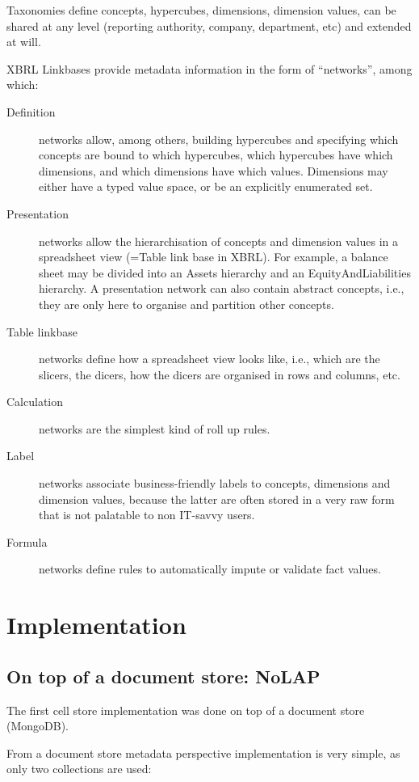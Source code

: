 \documentclass{vldb}
\begin{document}
Taxonomies define concepts, hypercubes, dimensions, dimension values, can be shared at any level (reporting authority, company, department, etc) and extended at will.

XBRL Linkbases provide metadata information in the form of ``networks'', among which:

\begin{description}
\item[Definition] networks allow, among others, building hypercubes and specifying which concepts are bound to which hypercubes, which hypercubes have which dimensions, and which dimensions have which values. Dimensions may either have a typed value space, or be an explicitly enumerated set. 
\item[Presentation] networks allow the hierarchisation of concepts and dimension values in a spreadsheet view (=Table link base in XBRL). For example, a balance sheet may be divided into an Assets hierarchy and an EquityAndLiabilities hierarchy. A presentation network can also contain abstract concepts, i.e., they are only here to organise and partition other concepts. 
\item[Table linkbase] networks define how a spreadsheet view looks like, i.e., which are the slicers, the dicers, how the dicers are organised in rows and columns, etc.
\item[Calculation] networks are the simplest kind of roll up rules.
\item[Label] networks associate business-friendly labels to concepts, dimensions and dimension values, because the latter are often stored in a very raw form that is not palatable to non IT-savvy users.
\item[Formula] networks define rules to automatically impute or validate fact values.
\end{description}

\section{Implementation}

\subsection{On top of a document store: NoLAP}

The first cell store implementation was done on top of a document store (MongoDB).

From a document store metadata perspective implementation is very simple, as only two collections are used:
\end{document}
